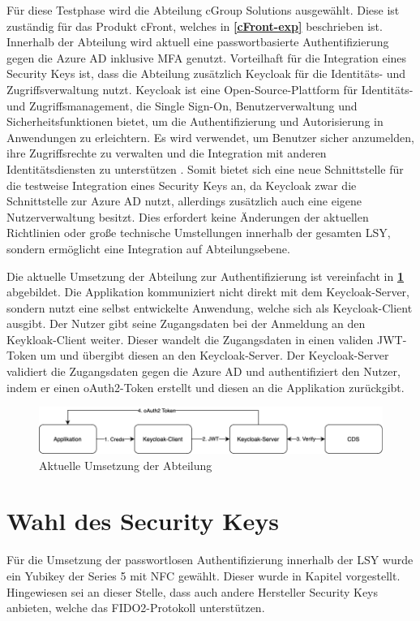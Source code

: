 Für diese Testphase wird die Abteilung cGroup Solutions ausgewählt. Diese ist zuständig für das Produkt cFront, welches in \textbf{\ref{cFront-exp}} beschrieben ist. Innerhalb der Abteilung wird aktuell eine passwortbasierte Authentifizierung gegen die Azure \ac{AD} inklusive \ac{MFA} genutzt. Vorteilhaft für die Integration eines Security Keys ist, dass die Abteilung zusätzlich Keycloak für die Identitäts- und Zugriffsverwaltung nutzt. Keycloak ist eine Open-Source-Plattform für Identitäts- und Zugriffsmanagement, die Single Sign-On, Benutzerverwaltung und Sicherheitsfunktionen bietet, um die Authentifizierung und Autorisierung in Anwendungen zu erleichtern. Es wird verwendet, um Benutzer sicher anzumelden, ihre Zugriffsrechte zu verwalten und die Integration mit anderen Identitätsdiensten zu unterstützen \cite{keycloak}. Somit bietet sich eine neue Schnittstelle für die testweise Integration eines Security Keys an, da Keycloak zwar die Schnittstelle zur Azure \ac{AD} nutzt, allerdings zusätzlich auch eine eigene Nutzerverwaltung besitzt. Dies erfordert keine Änderungen der aktuellen Richtlinien oder große technische Umstellungen innerhalb der gesamten \ac{LSY}, sondern ermöglicht eine Integration auf Abteilungsebene.

Die aktuelle Umsetzung der Abteilung zur Authentifizierung ist vereinfacht in \textbf{\ref{current-imp}} abgebildet. Die Applikation kommuniziert nicht direkt mit dem Keycloak-Server, sondern nutzt eine selbst entwickelte Anwendung, welche sich als Keycloak-Client ausgibt. Der Nutzer gibt seine Zugangsdaten bei der Anmeldung an den Keykloak-Client weiter. Dieser wandelt die Zugangsdaten in einen validen JWT-Token um und übergibt diesen an den Keycloak-Server. Der Keycloak-Server validiert die Zugangsdaten gegen die Azure \ac{AD} und authentifiziert den Nutzer, indem er einen oAuth2-Token erstellt und diesen an die Applikation zurückgibt.


\begin{figure}[h]
	\centering 
	\includegraphics[width=1\textwidth]{img/abbildungen/Unknown.png}
	\captionsetup{format=hang}
	\caption{Aktuelle Umsetzung der Abteilung} \label{current-imp}
\end{figure}

\section{Wahl des Security Keys} \label{secwahl}
Für die Umsetzung der passwortlosen Authentifizierung innerhalb der \ac{LSY} wurde ein Yubikey der Series 5 mit NFC gewählt. Dieser wurde in Kapitel vorgestellt. Hingewiesen sei an dieser Stelle, dass auch andere Hersteller Security Keys anbieten, welche das FIDO2-Protokoll unterstützen. 

